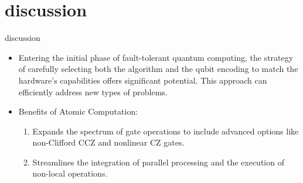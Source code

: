 \documentclass[18 pt]{beamer}
\begin{document}
\section{discussion}
\begin{frame}{discussion}
  \begin{itemize}[itemsep=15pt]
    \item Entering the initial phase of fault-tolerant quantum computing, the strategy of carefully selecting both the algorithm and the qubit encoding to match the hardware's capabilities offers significant potential. This approach can efficiently address new types of problems.
    \item Benefits of Atomic Computation:
        \begin{enumerate}[itemsep=10pt]
          \item Expands the spectrum of gate operations to include advanced options like non-Clifford CCZ and nonlinear CZ gates.
          \item Streamlines the integration of parallel processing and the execution of non-local operations.
        \end{enumerate}  
  \end{itemize}
\end{frame}
\end{document}
